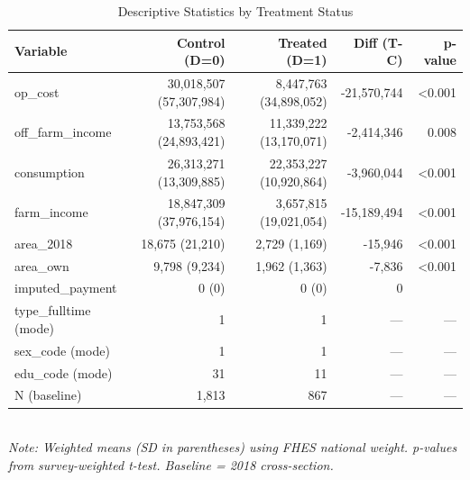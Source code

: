 \begin{table}[t]
\centering
\caption{Descriptive Statistics by Treatment Status}
\label{tab:descriptives_en}
\scriptsize
\setlength{\tabcolsep}{4pt}
\begin{tabular}{lrrrr}
\toprule
Variable & Control (D=0) & Treated (D=1) & Diff (T-C) & p-value \\
\midrule
op\_cost & 30,018,507 (57,307,984) & 8,447,763 (34,898,052) & -21,570,744 & <0.001 \\
off\_farm\_income & 13,753,568 (24,893,421) & 11,339,222 (13,170,071) & -2,414,346 & 0.008 \\
consumption & 26,313,271 (13,309,885) & 22,353,227 (10,920,864) & -3,960,044 & <0.001 \\
farm\_income & 18,847,309 (37,976,154) & 3,657,815 (19,021,054) & -15,189,494 & <0.001 \\
area\_2018 & 18,675 (21,210) & 2,729 (1,169) & -15,946 & <0.001 \\
area\_own & 9,798 (9,234) & 1,962 (1,363) & -7,836 & <0.001 \\
imputed\_payment & 0 (0) & 0 (0) & 0 &  \\
type\_fulltime (mode) & 1 & 1 & --- & --- \\
sex\_code (mode) & 1 & 1 & --- & --- \\
edu\_code (mode) & 31 & 11 & --- & --- \\
N (baseline) & 1,813 & 867 & --- & --- \\
\bottomrule
\end{tabular}
\\
\footnotesize\textit{Note: Weighted means (SD in parentheses) using FHES national weight. p-values from survey-weighted t-test. Baseline = 2018 cross-section.}
\end{table}

